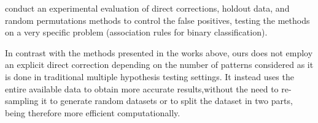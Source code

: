 

\citet{LiuZW11} conduct an experimental evaluation of  direct corrections, holdout data,
and random permutations methods to
control the false positives, testing the methods on a very specific problem
(association rules for binary classification).

In contrast with the methods presented in the works above,
ours does not employ an explicit direct correction depending on the number of
patterns considered as it is  done in traditional multiple hypothesis testing
settings. %
It instead uses the entire available data to obtain more accurate
results,without the need to re-sampling it to generate random datasets or to
split the dataset in two parts, being therefore more efficient computationally.


